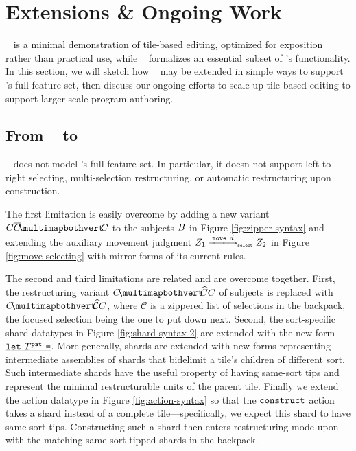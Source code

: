 \section{Extensions \& Ongoing Work}

\tylr~ is a minimal demonstration of tile-based
editing, optimized for exposition rather than practical use,
while \ty~ formalizes an essential subset of \tylr's functionality.
In this section, we will sketch how \ty~ may be extended
in simple ways to support \tylr's full feature set,
then discuss our ongoing efforts to scale up tile-based
editing to support larger-scale program authoring.

\subsection{From \ty~ to \tylr}

\ty~ does not model \tylr's full feature set.
In particular, it doesn not support left-to-right selecting,
multi-selection restructuring, or automatic restructuring
upon construction.

The first limitation is easily overcome by adding
a new variant $\selectingRight{\selection}{\selection}{\selection}$
to the subjects $B$ in Figure \ref{fig:zipper-syntax}
and extending the auxiliary movement judgment
$\smove{\editState_1}{\direction}{\editState_2}$
in Figure \ref{fig:move-selecting}
with mirror forms of its current rules.

The second and third limitations are related
and are overcome together.
First, the restructuring variant $\restructuring{\selection}{\selection}{\selection}$
of subjects is replaced with $\restructuring{\selection}{\mathcal{C}}\selection$,
where $\mathcal{C}$ is a zippered list of selections in the backpack,
the focused selection being the one to put down next.
Second, the sort-specific shard datatypes in Figure \ref{fig:shard-syntax-2}
are extended with
the new form $\underline{\texttt{let}~T^{\texttt{pat}}~\texttt{=}}$.
More generally, shards are extended with new forms
representing intermediate assemblies of shards that
bidelimit a tile's children of different sort.
Such intermediate shards have the useful property of having same-sort
tips and represent the minimal restructurable units of the
parent tile.
Finally we extend the action datatype in Figure \ref{fig:action-syntax}
so that the $\texttt{construct}$ action takes a shard instead of
a complete tile---specifically, we expect this shard to have same-sort tips.
Constructing such a shard then enters restructuring mode
upon with the matching same-sort-tipped shards in the backpack.


